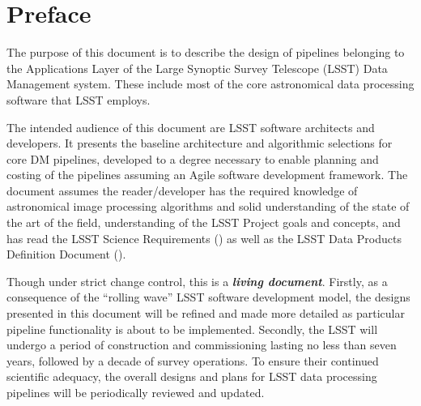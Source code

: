 \section{Preface}

The purpose of this document is to describe the design of pipelines belonging to the Applications Layer of the Large Synoptic Survey Telescope (LSST) Data Management system. These include most of the core astronomical data processing software that LSST employs.

The intended audience of this document are LSST software architects and developers. It presents the baseline architecture and algorithmic selections for core DM pipelines, developed to a degree necessary to enable planning and costing of the pipelines assuming an Agile software development framework. The document assumes the reader/developer has the required knowledge of astronomical image processing algorithms and solid understanding of the state of the art of the field, understanding of the LSST Project goals and concepts, and has read the LSST Science Requirements (\SRD) as well as the LSST Data Products Definition Document (\DPDD).


Though under strict change control, this is a \textbf{\emph{living document}}. Firstly, as a consequence of the ``rolling wave'' LSST software development model, the designs presented in this document will be refined and made more detailed as particular pipeline functionality is about to be implemented. Secondly, the LSST will undergo a period of construction and commissioning lasting no less than seven years, followed by a decade of survey operations. To ensure their continued scientific adequacy, the overall designs and plans for LSST data processing pipelines will be periodically reviewed and updated.
